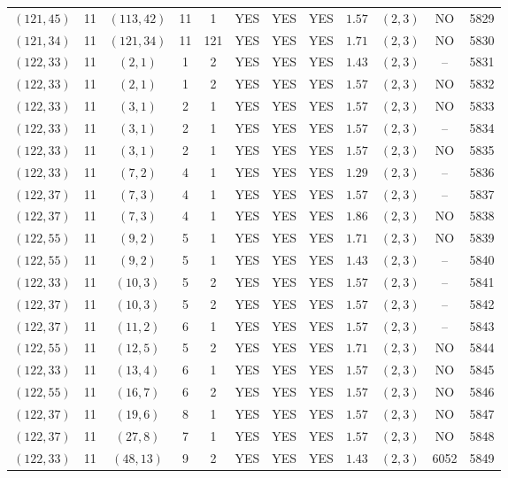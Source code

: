 \begin{longtable}{|c|c|c|c|c|c|c|c|c|c|c|c|}
$(121,45)$ & 11 & $(113,42)$ & 11 & 1 & YES & YES & YES & $1.57$ & $(2,3)$ & NO & 5829\\
$(121,34)$ & 11 & $(121,34)$ & 11 & 121 & YES & YES & YES & $1.71$ & $(2,3)$ & NO & 5830\\
$(122,33)$ & 11 & $(2,1)$ & 1 & 2 & YES & YES & YES & $1.43$ & $(2,3)$ & -- & 5831\\
$(122,33)$ & 11 & $(2,1)$ & 1 & 2 & YES & YES & YES & $1.57$ & $(2,3)$ & NO & 5832\\
$(122,33)$ & 11 & $(3,1)$ & 2 & 1 & YES & YES & YES & $1.57$ & $(2,3)$ & NO & 5833\\
$(122,33)$ & 11 & $(3,1)$ & 2 & 1 & YES & YES & YES & $1.57$ & $(2,3)$ & -- & 5834\\
$(122,33)$ & 11 & $(3,1)$ & 2 & 1 & YES & YES & YES & $1.57$ & $(2,3)$ & NO & 5835\\
$(122,33)$ & 11 & $(7,2)$ & 4 & 1 & YES & YES & YES & $1.29$ & $(2,3)$ & -- & 5836\\
$(122,37)$ & 11 & $(7,3)$ & 4 & 1 & YES & YES & YES & $1.57$ & $(2,3)$ & -- & 5837\\
$(122,37)$ & 11 & $(7,3)$ & 4 & 1 & YES & YES & YES & $1.86$ & $(2,3)$ & NO & 5838\\
$(122,55)$ & 11 & $(9,2)$ & 5 & 1 & YES & YES & YES & $1.71$ & $(2,3)$ & NO & 5839\\
$(122,55)$ & 11 & $(9,2)$ & 5 & 1 & YES & YES & YES & $1.43$ & $(2,3)$ & -- & 5840\\
$(122,33)$ & 11 & $(10,3)$ & 5 & 2 & YES & YES & YES & $1.57$ & $(2,3)$ & -- & 5841\\
$(122,37)$ & 11 & $(10,3)$ & 5 & 2 & YES & YES & YES & $1.57$ & $(2,3)$ & -- & 5842\\
$(122,37)$ & 11 & $(11,2)$ & 6 & 1 & YES & YES & YES & $1.57$ & $(2,3)$ & -- & 5843\\
$(122,55)$ & 11 & $(12,5)$ & 5 & 2 & YES & YES & YES & $1.71$ & $(2,3)$ & NO & 5844\\
$(122,33)$ & 11 & $(13,4)$ & 6 & 1 & YES & YES & YES & $1.57$ & $(2,3)$ & NO & 5845\\
$(122,55)$ & 11 & $(16,7)$ & 6 & 2 & YES & YES & YES & $1.57$ & $(2,3)$ & NO & 5846\\
$(122,37)$ & 11 & $(19,6)$ & 8 & 1 & YES & YES & YES & $1.57$ & $(2,3)$ & NO & 5847\\
$(122,37)$ & 11 & $(27,8)$ & 7 & 1 & YES & YES & YES & $1.57$ & $(2,3)$ & NO & 5848\\
$(122,33)$ & 11 & $(48,13)$ & 9 & 2 & YES & YES & YES & $1.43$ & $(2,3)$ & 6052 & 5849\\

\end{longtable}
